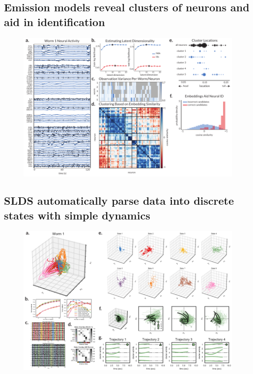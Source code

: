 \documentclass[11pt]{article}
\begin{document}
\subsection*{Emission models reveal clusters of neurons and aid in identification}

\begin{figure}[t]
\centering%
\includegraphics[width=6in]{figures/figure2} 
\caption{}
\label{fig:emissions}
\end{figure}


\subsection*{SLDS automatically parse data into discrete states with simple dynamics}

\begin{figure}[t]
\centering%
\includegraphics[width=6in]{figures/figure3} 
\caption{}
\label{fig:syllables}
\end{figure}
\end{document}
